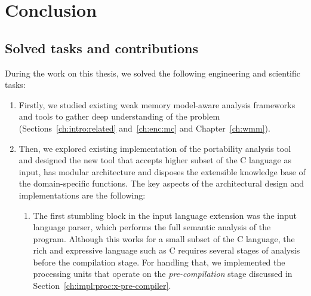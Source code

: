 \chapter{Conclusion}
\label{ch:summary}


\section{Solved tasks and contributions}

During the work on this thesis, we solved the following engineering and scientific tasks:

\begin{enumerate}[label=\arabic*.] %
\item
Firstly, we studied existing weak memory model-aware analysis frameworks and tools to gather deep understanding of the problem (Sections~\ref{ch:intro:related} and~\ref{ch:enc:mc} and Chapter~\ref{ch:wmm}).

\item
Then, we explored existing implementation of the portability analysis tool \textit{\porthos{}} and designed the new tool \textit{\porthos[2]} that accepts higher subset of the C language as input, has modular architecture and disposes the extensible knowledge base of the domain-specific functions.
The key aspects of the architectural design and implementations are the following:


  \begin{enumerate}[leftmargin=\parindent,label=\alph*.]
  \item The first stumbling block in the input language extension was the \porthos[1] input language parser, which performs the full semantic analysis of the program.
  Although this works for a small subset of the C language, the rich and expressive language such as C requires several stages of analysis before the compilation stage.
  For handling that, we implemented the processing units that operate on the \textit{pre-compilation} stage discussed in Section~\ref{ch:impl:proc:x-pre-compiler}.
  

\end{enumerate}
\end{enumerate}
